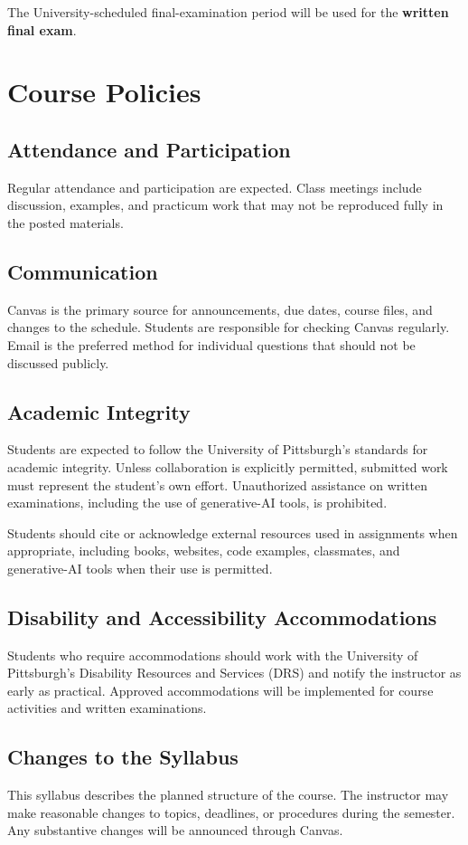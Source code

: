 \documentclass[11pt]{article}
\begin{document}
The University-scheduled final-examination period will be used for the \textbf{written final exam}.

\section{Course Policies}

\subsection{Attendance and Participation}

Regular attendance and participation are expected. Class meetings include discussion, examples, and practicum work that may not be reproduced fully in the posted materials.

\subsection{Communication}

Canvas is the primary source for announcements, due dates, course files, and changes to the schedule. Students are responsible for checking Canvas regularly. Email is the preferred method for individual questions that should not be discussed publicly.

\subsection{Academic Integrity}

Students are expected to follow the University of Pittsburgh's standards for academic integrity. Unless collaboration is explicitly permitted, submitted work must represent the student's own effort. Unauthorized assistance on written examinations, including the use of generative-AI tools, is prohibited.

Students should cite or acknowledge external resources used in assignments when appropriate, including books, websites, code examples, classmates, and generative-AI tools when their use is permitted.

\subsection{Disability and Accessibility Accommodations}

Students who require accommodations should work with the University of Pittsburgh's Disability Resources and Services (DRS) and notify the instructor as early as practical. Approved accommodations will be implemented for course activities and written examinations.

\subsection{Changes to the Syllabus}

This syllabus describes the planned structure of the course. The instructor may make reasonable changes to topics, deadlines, or procedures during the semester. Any substantive changes will be announced through Canvas.
\end{document}
